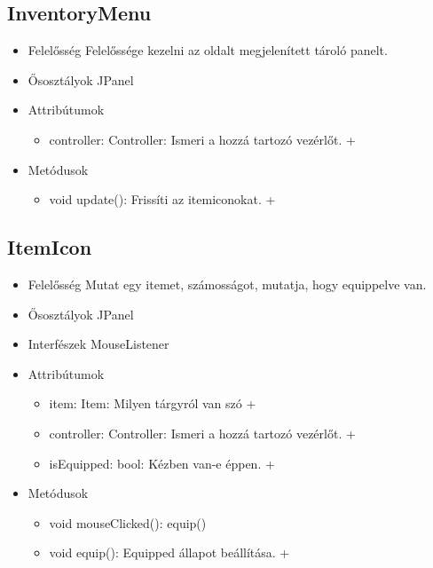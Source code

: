 \subsection{InventoryMenu}
\begin{itemize}
	\item Felelősség\newline
	Felelőssége kezelni az oldalt megjelenített tároló panelt.
	\item Ősosztályok\newline
	JPanel
	\item Attribútumok\newline
	\begin{itemize}
		\item controller: Controller: Ismeri a hozzá tartozó vezérlőt. +	
	\end{itemize}
	\item Metódusok\newline
	\begin{itemize}
		\item void update(): Frissíti az itemiconokat. +
	\end{itemize}
\end{itemize}

\subsection{ItemIcon}
\begin{itemize}
	\item Felelősség\newline
	Mutat egy itemet, számosságot, mutatja, hogy equippelve van.
	\item Ősosztályok\newline
	JPanel
	\item Interfészek\newline
	MouseListener
	\item Attribútumok\newline
	\begin{itemize}
		\item item: Item: Milyen tárgyról van szó +
		\item controller: Controller: Ismeri a hozzá tartozó vezérlőt. +	
		\item isEquipped: bool: Kézben van-e éppen. +
	\end{itemize}
	\item Metódusok\newline
	\begin{itemize}
		\item void mouseClicked(): equip()
		\item void equip(): Equipped állapot beállítása. +
	\end{itemize}
\end{itemize}

